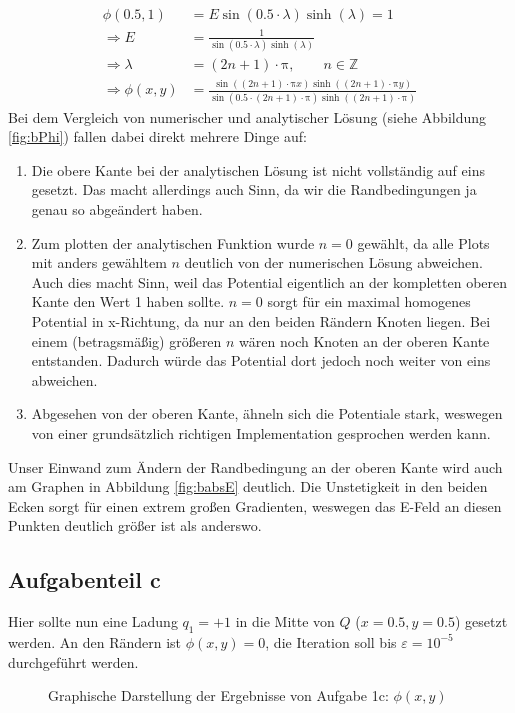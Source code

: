 \begin{align}
    \phi(0.5,1) &= E\sin(0.5\cdot\lambda)\sinh(\lambda) = 1 \\
    \Rightarrow E &= \frac{1}{\sin(0.5\cdot\lambda)\sinh(\lambda)} \\
    \Rightarrow \lambda &= (2n+1)\cdot\mathup{\pi}, \qquad n\in\mathbb{Z} \\
    \Rightarrow \phi(x,y) &= \frac{\sin((2n+1)\cdot\mathup{\pi} x)\sinh((2n+1)\cdot\mathup{\pi} y)}{\sin(0.5\cdot(2n+1)\cdot\mathup{\pi})\sinh((2n+1)\cdot\mathup{\pi})}
\end{align}
Bei dem Vergleich von numerischer und analytischer Lösung (siehe Abbildung \ref{fig:bPhi}) fallen dabei direkt mehrere Dinge auf:
\begin{enumerate}
    \item Die obere Kante bei der analytischen Lösung ist nicht vollständig auf eins gesetzt.
    Das macht allerdings auch Sinn, da wir die Randbedingungen ja genau so abgeändert haben.
    \item Zum plotten der analytischen Funktion wurde $n = 0$ gewählt, da alle Plots mit anders gewähltem $n$ deutlich von der numerischen Lösung abweichen.
    Auch dies macht Sinn, weil das Potential eigentlich an der kompletten oberen Kante den Wert 1 haben sollte.
    $n = 0$ sorgt für ein maximal homogenes Potential in x-Richtung, da nur an den beiden Rändern Knoten liegen.
    Bei einem (betragsmäßig) größeren $n$ wären noch Knoten an der oberen Kante entstanden.
    Dadurch würde das Potential dort jedoch noch weiter von eins abweichen.
    \item Abgesehen von der oberen Kante, ähneln sich die Potentiale stark, weswegen von einer grundsätzlich richtigen Implementation gesprochen werden kann.
\end{enumerate}
Unser Einwand zum Ändern der Randbedingung an der oberen Kante wird auch am Graphen in Abbildung \ref{fig:babsE} deutlich.
Die Unstetigkeit in den beiden Ecken sorgt für einen extrem großen Gradienten, weswegen das E-Feld an diesen Punkten deutlich größer ist als anderswo.
\subsection*{Aufgabenteil c}
Hier sollte nun eine Ladung $q_1 = +1$ in die Mitte von $Q$ ($x=0.5, y=0.5$) gesetzt werden. An den Rändern ist $\phi(x,y) = 0$, die Iteration soll bis $\varepsilon = 10^{-5}$ durchgeführt werden.

\begin{landscape}
	\begin{figure}
		\caption{Graphische Darstellung der Ergebnisse von Aufgabe 1c: $\phi(x,y)$}
		\label{fig:cPhi}
	\end{figure}
\end{landscape} 

